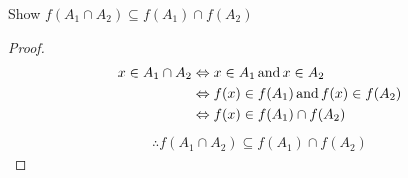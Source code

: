 \documentclass[12pt]{article}
\theoremstyle{definition}
\newenvironment{problem}[2][Problem]{\begin{trivlist}
    \item[\hskip \labelsep {\bfseries #1}\hskip \labelsep {\bfseries #2.}]}{\end{trivlist}}
\newcommand{\textop}[1]{\relax\ifmmode\mathop{\text{#1}}\else\text{#1}\fi} %
\begin{document}
\begin{problem}{6}
    Show $f(A_1 \cap A_2) \subseteq f(A_1) \cap f(A_2)$
\end{problem}
\begin{proof}
    \begin{align}
        x \in A_1 \cap A_2 & \Leftrightarrow x \in A_1 \textop{and} x \in A_2 \\
        & \Leftrightarrow f(x) \in f(A_1) \textop{and} f(x) \in f(A_2) \\
        & \Leftrightarrow f(x) \in f(A_1) \cap f(A_2) 
    \end{align}
    \begin{align*}
        \therefore f(A_1 \cap A_2) \subseteq f(A_1) \cap f(A_2)
    \end{align*}
\end{proof}
\end{document}
